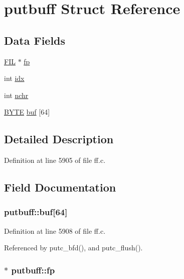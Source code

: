 \hypertarget{structputbuff}{}\section{putbuff Struct Reference}
\label{structputbuff}
\subsection*{Data Fields}
\begin{DoxyCompactItemize}
\item 
\hyperlink{structFIL}{F\+IL} $\ast$ \hyperlink{structputbuff_a5c7baa85e569be17f4888f5d92f4453c}{fp}
\item 
int \hyperlink{structputbuff_a10a3ca93af8df07e9836ebd5230c06d8}{idx}
\item 
int \hyperlink{structputbuff_a125366bfe48077e6f562f95e30b4604a}{nchr}
\item 
\hyperlink{integer_8h_a4ae1dab0fb4b072a66584546209e7d58}{B\+Y\+TE} \hyperlink{structputbuff_ae623199e5d2851f95050670170f20329}{buf} \mbox{[}64\mbox{]}
\end{DoxyCompactItemize}


\subsection{Detailed Description}


Definition at line 5905 of file ff.\+c.



\subsection{Field Documentation}
\subsubsection[{\texorpdfstring{buf}{buf}}]{ putbuff\+::buf\mbox{[}64\mbox{]}}\hypertarget{structputbuff_ae623199e5d2851f95050670170f20329}{}\label{structputbuff_ae623199e5d2851f95050670170f20329}


Definition at line 5908 of file ff.\+c.



Referenced by putc\+\_\+bfd(), and putc\+\_\+flush().

\subsubsection[{\texorpdfstring{fp}{fp}}]{$\ast$ putbuff\+::fp}\hypertarget{structputbuff_a5c7baa85e569be17f4888f5d92f4453c}{}\label{structputbuff_a5c7baa85e569be17f4888f5d92f4453c}


